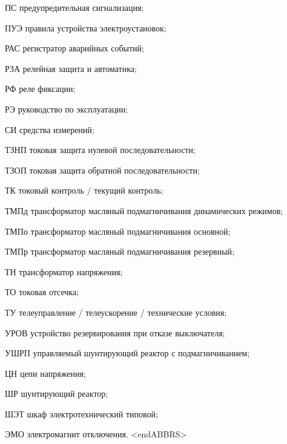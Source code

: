 \begin{list}{}
\item[ПС] предупредительная сигнализация;
\item[ПУЭ] правила устройства электроустановок;
\item[РАС] регистратор аварийных событий;
\item[РЗА] релейная защита и автоматика;
\item[РФ] реле фиксации;
\item[РЭ] руководство по эксплуатации;
\item[СИ] средства измерений;
\item[ТЗНП] токовая защита нулевой последовательности;
\item[ТЗОП] токовая защита обратной последовательности;
\item[ТК] токовый контроль / текущий контроль;
\item[ТМПд] трансформатор масляный подмагничивания динамических режимов;
\item[ТМПо] трансформатор масляный подмагничивания основной;
\item[ТМПр] трансформатор масляный подмагничивания резервный;
\item[ТН] трансформатор напряжения;
\item[ТО] токовая отсечка;
\item[ТУ] телеуправление / телеускорение / технические условия;
\item[УРОВ] устройство резервирования при отказе выключателя;
\item[УШРП] управляемый шунтирующий реактор с подмагничиванием;
\item[ЦН] цепи напряжения;
\item[ШР] шунтирующий реактор;
\item[ШЭТ] шкаф электротехнический типовой;
\item[ЭМО] электромагнит отключения.
{\color{white}\fontsize{0.1pt}{0.1pt}\selectfont<endABBRS>}
\end{list}
